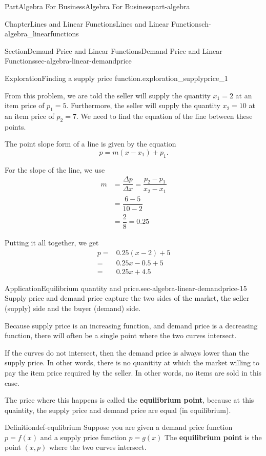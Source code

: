 \documentclass[oneside,10pt,]{tufte-book}
\newcommand{\terminology}[1]{\textbf{#1}}
\numberwithin{equation}{chapter}
\newcommand{\amp}{&}
\begin{document}
\begin{partptx}{Part}{Algebra For Business}{}{Algebra For Business}{}{}{part-algebra}
\begin{chapterptx}{Chapter}{Lines and Linear Functions}{}{Lines and Linear Functions}{}{}{ch-algebra_linearfunctions}
\begin{sectionptx}{Section}{Demand Price and Linear Functions}{}{Demand Price and Linear Functions}{}{}{sec-algebra-linear-demandprice}
\begin{exploration}{Exploration}{Finding a supply price function.}{exploration_supplyprice_1}
\par
From this problem, we are told the seller will supply the quantity \(x_1=2\) at an item price of \(p_1 = 5\).  Furthermore, the seller will supply the quantity \(x_2=10\) at an item price of \(p_2=7\).  We need to find the equation of the line between these points.%
\par
The point slope form of a line is given by the equation%
\begin{equation*}
p = m (x- x_1) + p_1\text{.}
\end{equation*}
%
\par
For the slope of the line, we use%
\begin{align*}
m \amp = \dfrac{\Delta p}{\Delta x} = \dfrac{p_2-p_1}{x_2-x_1}\\
\amp = \dfrac{6-5}{10-2}\\
\amp = \dfrac{2}{8}= 0.25
\end{align*}
%
\par
Putting it all together, we get%
\begin{align*}
p = \amp 0.25 (x-2) + 5\\
= \amp 0.25x - 0.5 + 5\\
= \amp 0.25x + 4.5
\end{align*}
%
\end{exploration}%
\begin{insight}{Application}{Equilibrium quantity and price.}{sec-algebra-linear-demandprice-15}%
Supply price and demand price capture the two sides of the market, the seller (supply) side and the buyer (demand) side.%
\par
Because supply price is an increasing function, and demand price is a decreasing function, there will often be a single point where the two curves intersect.%
\par
If the curves do not intersect, then the demand price is always lower than the supply price. In other words, there is no quanitity at which the market  willing to pay the item price required by  the seller.  In other words, no items are sold in this case.%
\par
The price where this happens is called the \terminology{equilibrium point}, because at this quaintity, the supply price and demand price are equal (in equilibrium).%
\end{insight}
\begin{definition}{Definition}{}{def-equlibrium}%
Suppose you are given a demand price function \(p = f(x)\) and a supply price function \(p=g(x)\) The \terminology{equilibrium  point} is the point \((x,p)\) where the two curves intersect.%

\end{definition}
\end{sectionptx}
\end{chapterptx}
\end{partptx}
\end{document}
